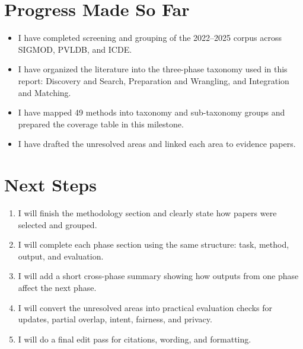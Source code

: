 \documentclass[sigconf]{acmart}
\begin{document}
\section{Progress Made So Far}
\begin{itemize}[leftmargin=*,itemsep=3pt]
  \item I have completed screening and grouping of the 2022--2025 corpus across SIGMOD, PVLDB, and ICDE.
  \item I have organized the literature into the three-phase taxonomy used in this report: Discovery and Search, Preparation and Wrangling, and Integration and Matching.
  \item I have mapped 49 methods into taxonomy and sub-taxonomy groups and prepared the coverage table in this milestone.
  \item I have drafted the unresolved areas and linked each area to evidence papers.
\end{itemize}

\section{Next Steps}
\begin{enumerate}[leftmargin=*,itemsep=3pt,topsep=1pt,partopsep=0pt,parsep=0pt]
  \item I will finish the methodology section and clearly state how papers were selected and grouped.
  \item I will complete each phase section using the same structure: task, method, output, and evaluation.
  \item I will add a short cross-phase summary showing how outputs from one phase affect the next phase.
  \item I will convert the unresolved areas into practical evaluation checks for updates, partial overlap, intent, fairness, and privacy.
  \item I will do a final edit pass for citations, wording, and formatting.
\end{enumerate}

\newpage
\balance


\end{document}
